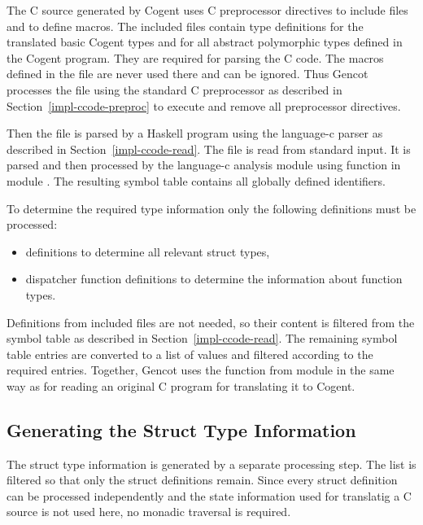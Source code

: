 The  C source generated by Cogent uses C preprocessor directives to include files and to define macros.
The included files contain type definitions for the translated basic Cogent types and for all abstract
polymorphic types defined in the Cogent program. They are required for parsing the C code. The 
macros defined in the  file are never used there and can be ignored. Thus Gencot processes the
 file using the standard C preprocessor  as described in Section~\ref{impl-ccode-preproc}
to execute and remove all preprocessor directives.

Then the file is parsed by a Haskell program using the language-c parser as described in 
Section~\ref{impl-ccode-read}. The file is read from standard input. It is parsed and then processed
by the language-c analysis module using function  in module .
The resulting symbol table contains all globally defined identifiers.

To determine the required type information only the following definitions must be processed:
\begin{itemize}
\item {} definitions to determine all relevant struct types,
\item dispatcher function definitions to determine the information about function types.
\end{itemize}
Definitions from included files are not needed, so their content is filtered from the symbol table
as described in Section~\ref{impl-ccode-read}. The remaining symbol table entries are converted to
a list of  values and filtered according to the required entries. Together,
Gencot uses the function  from module  in the same way as
for reading an original C program for translating it to Cogent.

\subsection{Generating the Struct Type Information}
\label{impl-ctypinfo-struct}

The struct type information is generated by a separate processing step. The  list is filtered
so that only the struct definitions remain. Since every struct definition can be processed independently
and the state information used for translatig a C source is not used here, no monadic traversal is required. 

